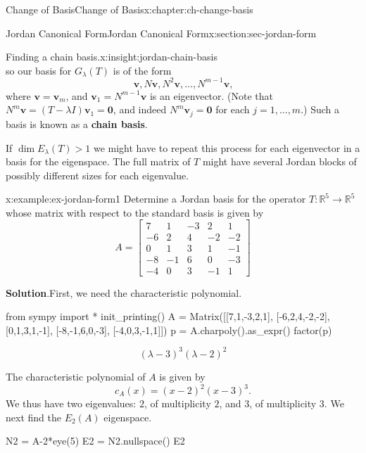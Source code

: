 \documentclass[oneside,10pt,]{book}
\newcommand{\blocktitlefont}{\relax}
\newcommand{\terminology}[1]{\textbf{#1}}
\numberwithin{equation}{section}
\newcommand{\bbm}{\begin{bmatrix}}
\newcommand{\ebm}{\end{bmatrix}}
\newcommand{\R}{\mathbb{R}}
\newcommand{\vv}{\mathbf{v}}
\newcommand{\zer}{\mathbf{0}}
\newcommand{\gt}{>}
\newcommand{\amp}{&}
\begin{document}
\begin{chapterptx}{Change of Basis}{}{Change of Basis}{}{}{x:chapter:ch-change-basis}
\begin{sectionptx}{Jordan Canonical Form}{}{Jordan Canonical Form}{}{}{x:section:sec-jordan-form}
\begin{insight}{Finding a chain basis.}{x:insight:jordan-chain-basis}
\begin{equation*}
\end{equation*}
so our basis for \(G_\lambda(T)\) is of the form%
\begin{equation*}
\vv, N\vv, N^2\vv, \ldots, N^{m-1}\vv\text{,}
\end{equation*}
where \(\vv = \vv_m\), and \(\vv_1=N^{m-1}\vv\) is an eigenvector. (Note that \(N^m\vv = (T-\lambda I)\vv_1=\zer\), and indeed \(N^m\vv_j=\zer\) for each \(j=1,\ldots, m\).) Such a basis is known as a \terminology{chain basis}.%
\par
If \(\dim E_\lambda(T)\gt 1\) we might have to repeat this process for each eigenvector in a basis for the eigenspace. The full matrix of \(T\) might have several Jordan blocks of possibly different sizes for each eigenvalue.%
\end{insight}
\begin{example}{}{x:example:ex-jordan-form1}%
Determine a Jordan basis for the operator \(T:\R^5\to \R^5\) whose matrix with respect to the standard basis is given by%
\begin{equation*}
A = \bbm 7\amp 1 \amp -3\amp 2\amp 1\\
-6\amp 2\amp 4\amp -2\amp -2\\
0 \amp 1\amp 3 \amp 1\amp -1\\
-8\amp -1\amp 6\amp 0 \amp-3\\
-4\amp 0\amp 3\amp -1\amp 1\ebm
\end{equation*}
%
\par\smallskip%
\noindent\textbf{\blocktitlefont Solution}.\label{g:solution:idm45936164602752}{}\hypertarget{g:solution:idm45936164602752}{}\quad{}First, we need the characteristic polynomial.%
\begin{sageinput}
from sympy import *
init_printing()
A = Matrix([[7,1,-3,2,1],
            [-6,2,4,-2,-2],
            [0,1,3,1,-1],
            [-8,-1,6,0,-3],
            [-4,0,3,-1,1]])
p = A.charpoly().as_expr()
factor(p)
\end{sageinput}
\begin{sageoutput}
\[(\lambda-3)^3(\lambda-2)^2\]
\end{sageoutput}
The characteristic polynomial of \(A\) is given by%
\begin{equation*}
c_A(x)=(x-2)^2(x-3)^3\text{.}
\end{equation*}
We thus have two eigenvalues: \(2\), of multiplicity \(2\), and \(3\), of multiplicity \(3\). We next find the \(E_2(A)\) eigenspace.%
\begin{sageinput}
N2 = A-2*eye(5)
E2 = N2.nullspace()
E2

\end{sageinput}
\end{example}
\end{sectionptx}
\end{chapterptx}
\end{document}
